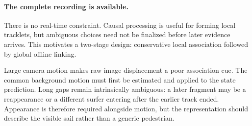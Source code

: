 \paragraph{The complete recording is available.}
There is no real-time constraint.  Causal processing is useful for forming local
tracklets, but ambiguous choices need not be finalized before later evidence arrives.
This motivates a two-stage design: conservative local association followed by global
offline linking.

Large camera motion makes raw image displacement a poor association cue.  The common
background motion must first be estimated and applied to the state prediction.  Long
gaps remain intrinsically ambiguous: a later fragment may be a reappearance or a
different surfer entering after the earlier track ended.  Appearance is therefore
required alongside motion, but the representation should describe the visible sail
rather than a generic pedestrian.

